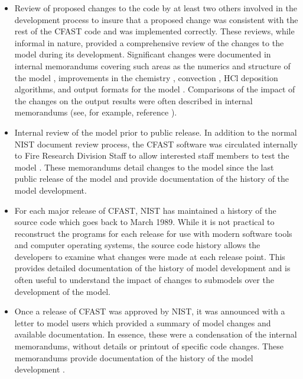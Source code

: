\begin{itemize}
\item Review of proposed changes to the code by at least two others involved in the development process to insure that a proposed change was consistent with the rest of the CFAST code and was implemented correctly. These reviews, while informal in nature, provided a comprehensive review of the changes to the model during its development.  Significant changes were documented in internal memorandums covering such areas as the numerics and structure of the model \cite{Peacock:1992}, improvements in the chemistry \cite{Peacock:1994}, convection \cite{Peacock:1993a}, HCl deposition \cite{Peacock:1993b} algorithms, and output formats for the model \cite{Peacock:1993c}. Comparisons of the impact of the changes on the output results were often described in internal memorandums (see, for example, reference \cite{Peacock:1992}).

\item Internal review of the model prior to public release.  In addition to the normal NIST document review process, the CFAST software was circulated internally to Fire Research Division Staff to allow interested staff members to test the model \cite{Jones:1996b, Jones:1997, Jones:2000}. These memorandums detail changes to the model since the last public release of the model and provide documentation of the history of the model development.

\item For each major release of CFAST, NIST has maintained a history of the source code which goes back to March 1989.  While it is not practical to reconstruct the programs for each release for use with modern software tools and computer operating systems, the source code history allows the developers to examine what changes were made at each release point. This provides detailed documentation of the history of model development and is often useful to understand the impact of changes to submodels over the development of the model.

\item Once a release of CFAST was approved by NIST, it was announced with a letter to model users which provided a summary of model changes and available documentation.  In essence, these were a condensation of the internal memorandums, without details or printout of specific code changes.  These memorandums provide documentation of the history of the model development \cite{Group:1991, Group:1992, Group:1993, Group:1996, Group:1996a}.
\end{itemize}

